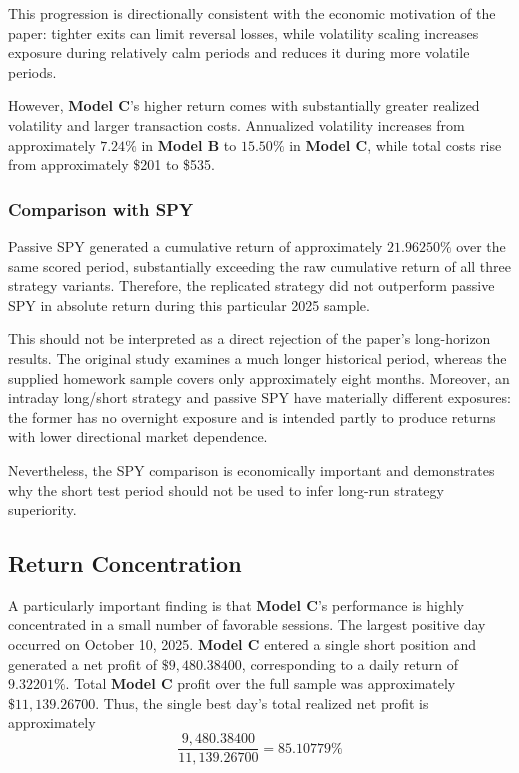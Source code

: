 \documentclass{article}
\begin{document}
This progression is directionally consistent with the economic motivation of the paper: tighter exits can limit reversal losses, while volatility scaling increases exposure during relatively calm periods and reduces it during more volatile periods.

However,\textbf{ Model C}'s higher return comes with substantially greater realized volatility and larger transaction costs. Annualized volatility increases from approximately \(7.24\%\) in\textbf{ Model B} to \(15.50\%\) in\textbf{ Model C}, while total costs rise from approximately \$201 to \$535.

\subsubsection{Comparison with SPY}

Passive SPY generated a cumulative return of approximately \(21.96250\%\) over the same scored period, substantially exceeding the raw cumulative return of all three strategy variants. Therefore, the replicated strategy did not outperform passive SPY in absolute return during this particular 2025 sample.

This should not be interpreted as a direct rejection of the paper's long-horizon results. The original study examines a much longer historical period, whereas the supplied homework sample covers only approximately eight months. Moreover, an intraday long/short strategy and passive SPY have materially different exposures: the former has no overnight exposure and is intended partly to produce returns with lower directional market dependence.

Nevertheless, the SPY comparison is economically important and demonstrates why the short test period should not be used to infer long-run strategy superiority.

\subsection{Return Concentration}

A particularly important finding is that\textbf{ Model C}'s performance is highly concentrated in a small number of favorable sessions. The largest positive day occurred on October 10, 2025.\textbf{ Model C} entered a single short position and generated a net profit of \(\$9{,}480.38400\), corresponding to a daily return of \(9.32201\%\). Total\textbf{ Model C} profit over the full sample was approximately \(\$11{,}139.26700\). Thus, the single best day's  total realized net profit is approximately
\[
    \frac{9{,}480.38400}{11{,}139.26700}
    =
    85.10779\%
\]
\end{document}
